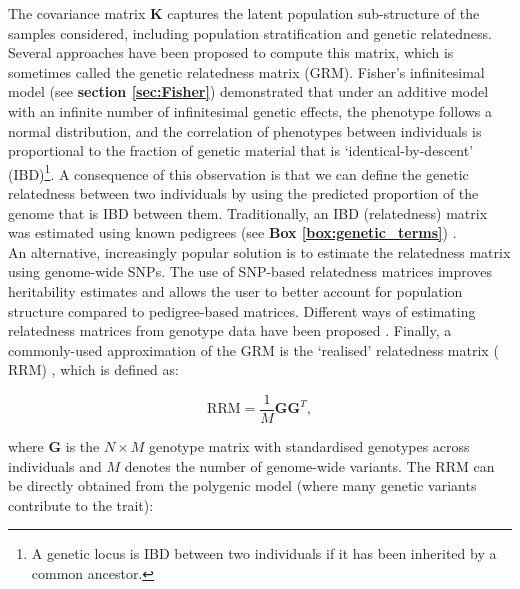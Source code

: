 The covariance matrix $\mathbf{K}$ captures the latent population sub-structure of the samples considered, including population stratification and genetic relatedness.\\

Several approaches have been proposed to compute this matrix, which is sometimes called the genetic relatedness matrix (GRM).
Fisher’s infinitesimal model (see \textbf{section \ref{sec:Fisher}}) \cite{fisher1919xv} demonstrated that under an additive model with an infinite number of infinitesimal genetic effects, the phenotype follows a normal distribution, and the correlation of phenotypes between individuals is proportional to the fraction of genetic material that is `identical-by-descent' (IBD)\footnote{A genetic locus is IBD between two individuals if it has been inherited by a common ancestor.}. 
A consequence of this observation is that we can define the genetic relatedness between two individuals by using the predicted proportion of the genome that is IBD between them. 
Traditionally, an IBD (relatedness) matrix was estimated using known pedigrees (see \textbf{Box \ref{box:genetic_terms}}) \cite{lange1976extensions}. 
\\

An alternative, increasingly popular solution is to estimate the relatedness matrix using genome-wide SNPs. 
The use of SNP-based relatedness matrices improves
heritability estimates \cite{visscher2006assumption, visscher2007genome, hayes2009increased} and allows the user to better account for population structure \cite{kang2008efficient, lee2010using} compared to pedigree-based matrices. 
Different ways of estimating relatedness matrices from genotype data have been proposed \cite{oliehoek2006estimating, purcell2007plink, vanraden2008efficient}. 
Finally, a commonly-used approximation of the GRM is the `realised' relatedness matrix ($\mathrm{RRM}$) \cite{hayes2009increased}, which is defined as:

 \begin{equation}
    \mathrm{RRM} = \frac{1}{M}\mathbf{G}\mathbf{G}^T,
\end{equation}

where $\mathbf{G}$ is the $N \times M$ genotype matrix with standardised genotypes across individuals and $M$ denotes the number of genome-wide variants. 
The $\mathrm{RRM}$ can be directly obtained from the polygenic model (where many genetic variants contribute to the trait):

